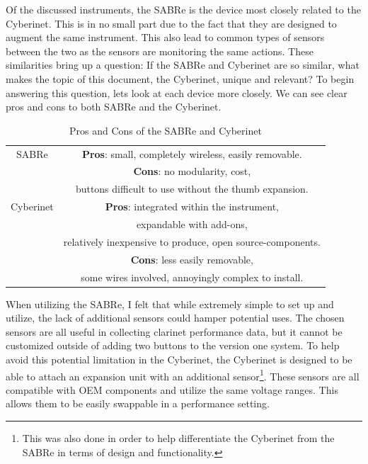 Of the discussed instruments, the SABRe is the device most closely related to the Cyberinet. This is in no small part due to the fact that they are designed to augment the same instrument. This also lead to common types of sensors between the two as the sensors are monitoring the same actions. These similarities bring up a question: If the SABRe and Cyberinet are so similar, what makes the topic of this document, the Cyberinet, unique and relevant? To begin answering this question, lets look at each device more closely. We can see clear pros and cons to both SABRe and the Cyberinet.



\begin{table}[]
    \centering
    \begin{tabular}{|c||c|}
    \hline
     SABRe & \textbf{Pros}: small, completely wireless, easily removable. \\
         & \textbf{Cons}: no modularity, cost, \\
         & buttons difficult to use without the thumb expansion.\\
    Cyberinet & \textbf{Pros}: integrated within the instrument,\\
    & expandable with add-ons,\\ 
    & relatively inexpensive to produce, open source-components.\\
    & \textbf{Cons}: less easily removable, \\
    & some wires involved, annoyingly complex to install.
    \hline
    \end{tabular}
    \caption{Pros and Cons of the SABRe and Cyberinet}
    \label{tab:sabreCyberinetProCons}
\end{table}



When utilizing the SABRe, I felt that while extremely simple to set up and utilize, the lack of additional sensors could hamper potential uses. The chosen sensors are all useful in collecting clarinet performance data, but it cannot be customized outside of adding two buttons to the version one system. To help avoid this potential limitation in the Cyberinet, the Cyberinet is designed to be able to attach an expansion unit with an additional sensor\footnote{This was also done in order to help differentiate the Cyberinet from the SABRe in terms of design and functionality.}. These sensors are all compatible with OEM components and utilize the same voltage ranges. This allows them to be easily swappable in a performance setting.

